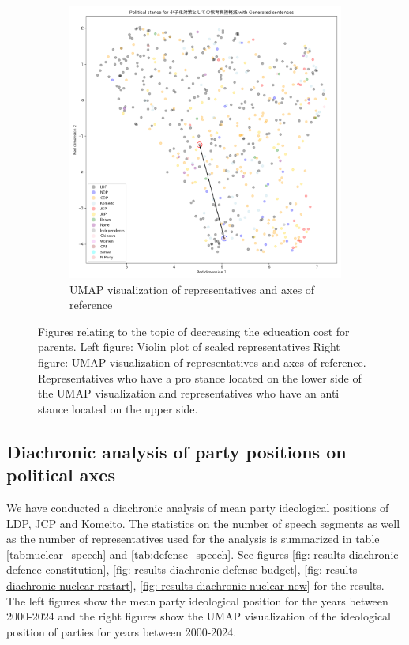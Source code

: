 \documentclass[final,5p,times,twocolumn,authoryear]{elsarticle}
\begin{document}
\begin{figure}[h]
\begin{subfigure}{0.22\textwidth}
      \includegraphics[width=\linewidth]{figs/results/aging/少子化対策としての教育負担軽減_umap_gen.png}
      \caption{UMAP visualization of representatives and axes of reference}
    \end{subfigure}
\caption{Figures relating to the topic of decreasing the education cost for parents. Left figure: Violin plot of scaled representatives Right figure: UMAP visualization of representatives and axes of reference. Representatives who have a pro stance located on the lower side of the UMAP visualization and representatives who have an anti stance located on the upper side.}
\label{fig: results-aging-education-cost}
\end{figure}


\FloatBarrier

\subsection{Diachronic analysis of party positions on political axes}
\label{section: diachronic}
We have conducted a diachronic analysis of mean party ideological positions of LDP, JCP and Komeito. The statistics on the number of speech segments as well as the number of representatives used for the analysis is summarized in table \ref{tab:nuclear_speech} and \ref{tab:defense_speech}. See figures \ref{fig: results-diachronic-defence-constitution}, \ref{fig: results-diachronic-defense-budget}, \ref{fig: results-diachronic-nuclear-restart}, \ref{fig: results-diachronic-nuclear-new} for the results. The left figures show the mean party ideological position for the years between 2000-2024 and the right figures show the UMAP visualization of the ideological position of parties for years between 2000-2024.
\end{document}

